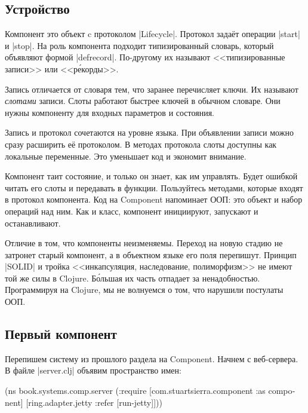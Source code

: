 \subsection{Устройство}

Компонент это объект c протоколом \spverb|Lifecycle|. Протокол зада\"{е}т операции
\spverb|start| и \spverb|stop|. На роль компонента подходит типизированный
словарь, который объявляют формой \spverb|defrecord|. По-другому их называют
<<типизированные записи>> или <<р\'{е}корды>>.

Запись отличается от словаря тем, что заранее перечисляет ключи. Их называют
\emph{слотами} записи. Слоты работают быстрее ключей в обычном словаре. Они
нужны компоненту для входных параметров и состояния.

Запись и протокол сочетаются на уровне языка. При объявлении записи можно сразу
расширить е\"{е} протоколом. В методах протокола слоты доступны как локальные
переменные. Это уменьшает код и экономит внимание.

Компонент таит состояние, и только он знает, как им управлять. Будет ошибкой
читать его слоты и передавать в функции. Пользуйтесь методами, которые входят в
протокол компонента. Код на Component напоминает ООП: это объект и набор
операций над ним. Как и класс, компонент инициируют, запускают и останавливают.

Отличие в том, что компоненты неизменяемы. Переход на новую стадию не затронет
старый компонент, а в объектном языке его поля перепишут. Принцип \spverb|SOLID|
и тройка <<инкапсуляция, наследование, полиморфизм>> не имеют той же силы в
Clojure. Б\'{о}льшая их часть отпадает за ненадобностью. Программируя на
Clojure, мы не волнуемся о том, что нарушили постулаты ООП.

\subsection{Первый компонент}

Перепишем систему из прошлого раздела на Component. Начнем с веб-сервера. В
файле \spverb|server.clj| объявим пространство имен:

\begin{english}
  \begin{clojure}
(ns book.systems.comp.server
  (:require
   [com.stuartsierra.component :as component]
   [ring.adapter.jetty :refer [run-jetty]]))
  \end{clojure}
\end{english}

